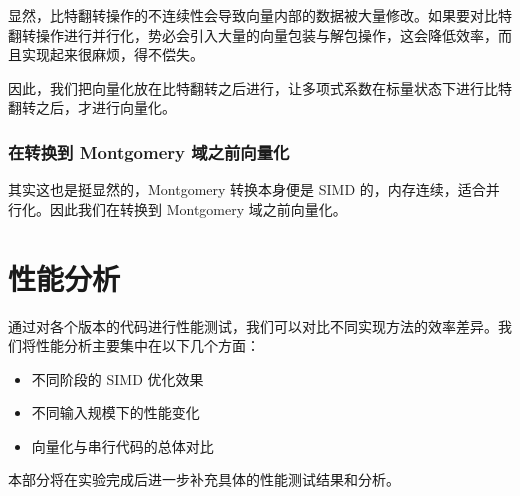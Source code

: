 \documentclass[a4paper]{article}
\begin{document}
显然，比特翻转操作的不连续性会导致向量内部的数据被大量修改。如果要对比特翻转操作进行并行化，势必会引入大量的向量包装与解包操作，这会降低效率，而且实现起来很麻烦，得不偿失。

因此，我们把向量化放在比特翻转之后进行，让多项式系数在标量状态下进行比特翻转之后，才进行向量化。

\subsubsection{在转换到 Montgomery 域之前向量化}

其实这也是挺显然的，Montgomery 转换本身便是 SIMD 的，内存连续，适合并行化。因此我们在转换到 Montgomery 域之前向量化。

\section{性能分析}

通过对各个版本的代码进行性能测试，我们可以对比不同实现方法的效率差异。我们将性能分析主要集中在以下几个方面：

\begin{itemize}
    \item 不同阶段的 SIMD 优化效果
    \item 不同输入规模下的性能变化
    \item 向量化与串行代码的总体对比
\end{itemize}

本部分将在实验完成后进一步补充具体的性能测试结果和分析。
\end{document}

